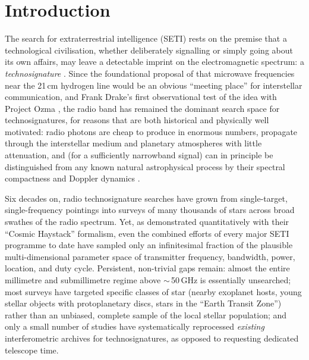 \documentclass{openjournal}
\begin{document}

\section{Introduction}
\label{sec:intro}

The search for extraterrestrial intelligence (SETI) rests on the premise that a
technological civilisation, whether deliberately signalling or simply going about
its own affairs, may leave a detectable imprint on the electromagnetic spectrum: a
\emph{technosignature} \citep{Sheikh2020,SETIreview2025}. Since the foundational
proposal of \citet{CocconiMorrison1959} that microwave frequencies near the 21\,cm
hydrogen line would be an obvious ``meeting place'' for interstellar communication,
and Frank Drake's first observational test of the idea with Project Ozma
\citep{Drake1960}, the radio band has remained the dominant search space for
technosignatures, for reasons that are both historical and physically well
motivated: radio photons are cheap to produce in enormous numbers, propagate
through the interstellar medium and planetary atmospheres with little attenuation,
and (for a sufficiently narrowband signal) can in principle be distinguished from
any known natural astrophysical process by their spectral compactness and Doppler
dynamics \citep{Sheikh2020}.

Six decades on, radio technosignature searches have grown from single-target,
single-frequency pointings into surveys of many thousands of stars across broad
swathes of the radio spectrum. Yet, as \citet{Wright2018} demonstrated
quantitatively with their ``Cosmic Haystack'' formalism, even the combined efforts
of every major SETI programme to date have sampled only an infinitesimal fraction
of the plausible multi-dimensional parameter space of transmitter frequency,
bandwidth, power, location, and duty cycle. Persistent, non-trivial gaps remain:
almost the entire millimetre and submillimetre regime above $\sim$\,50\,GHz is
essentially unsearched; most surveys have targeted specific classes of star
(nearby exoplanet hosts, young stellar objects with protoplanetary discs, stars in
the ``Earth Transit Zone'') rather than an unbiased, complete sample of the local
stellar population; and only a small number of studies have systematically
reprocessed \emph{existing} interferometric archives for technosignatures, as
opposed to requesting dedicated telescope time.
\end{document}
